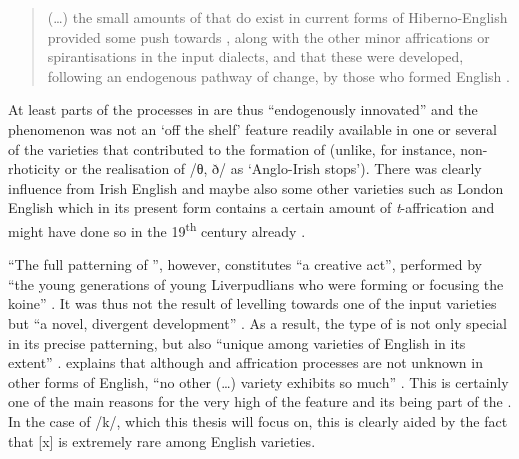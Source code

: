 	\begin{quote}
		(\ldots) the small amounts of   that do exist in current forms of Hiberno-English provided some push towards , along with the other minor affrications or spirantisations in the input dialects, and that these were developed, following an endogenous pathway of change, by those who formed  English \citeyearpar[131]{honeybone2007}.
	\end{quote}

At least parts of the  processes in  are thus ``endogenously innovated'' \citep[130]{honeybone2007} and the phenomenon was not an `off the shelf' feature readily available in one or several of the varieties that contributed to the formation of  (unlike, for instance, non-rhoticity or the realisation of /θ, ð/ as `Anglo-Irish stops').
There was clearly influence from Irish English and maybe also some other varieties such as London English which in its present form contains a certain amount of \emph{t}-affrication and might have done so in the 19\textsuperscript{th} century already \parencite[cf.][132]{honeybone2007}.

``The full patterning of  '', however, constitutes ``a creative act'', performed by ``the young generations of young Liverpudlians who were forming or focusing the koine'' \parencite[132]{honeybone2007}.
It was thus not the result of levelling towards one of the input varieties but ``a novel, divergent development'' \parencite[132]{honeybone2007}.
As a result, the  type of  is not only special in its precise patterning, but also ``unique among varieties of English in its extent'' \parencite[132]{honeybone2007}.
\textcite[130]{honeybone2007} explains that although  and affrication processes are not unknown in other forms of English, ``no other (\ldots) variety exhibits so much'' \parencite[130]{honeybone2007}.
This is certainly one of the main reasons for the very high  of the feature and its being part of the  .
In the case of /k/, which this thesis will focus on, this is clearly aided by the fact that [x] is extremely rare among English varieties.

